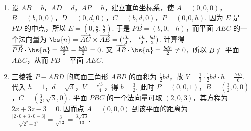\begin{solution}
\begin{enumerate}
\item 设 \(AB=b\)，\(AD=d\)，\(AP=h\)，建立直角坐标系，使
\(A=(0,0,0)\)，\(B=(b,0,0)\)，\(D=(0,d,0)\)，\(C=(b,d,0)\)，\(P=(0,0,h)\). 因为 \(E\) 是 \(PD\) 的中点，所以 \(E=(0,\frac d2,\frac h2)\).
于是 \(\overrightarrow{PB}=(b,0,-h)\)，而平面 \(AEC\) 的一个法向量为
\(\bs{n}=\overrightarrow{AC}\times\overrightarrow{AE}=(\frac{dh}{2},-\frac{bh}{2},\frac{bd}{2})\).
计算得 \(\overrightarrow{PB}\cdot\bs{n}=\frac{bdh}{2}-\frac{bdh}{2}=0\). 又 \(\overrightarrow{AB}\cdot\bs{n}=\frac{bdh}{2}\ne0\)，所以 \(B\notin\) 平面 \(AEC\)，从而 \(PB\parallel\) 平面 \(AEC\).
\item 三棱锥 \(P-ABD\) 的底面三角形 \(ABD\) 的面积为 \(\frac12bd\)，故
\(V=\frac13\cdot\frac12bd\cdot h=\frac{bdh}{6}\). 代入 \(h=1\)，\(d=\sqrt3\)，\(V=\frac{\sqrt3}{4}\)，得 \(b=\frac32\).
此时 \(P=(0,0,1)\)，\(B=(\frac32,0,0)\)，\(C=(\frac32,\sqrt3,0)\). 平面 \(PBC\) 的一个法向量可取 \((2,0,3)\)，其方程为 \(2x+3z-3=0\). 因而点 \(A=(0,0,0)\) 到该平面的距离为
\(\displaystyle\frac{|2\cdot0+3\cdot0-3|}{\sqrt{2^2+3^2}}=\frac{3}{\sqrt{13}}=\frac{3\sqrt{13}}{13}\).
\end{enumerate}
\end{solution}

